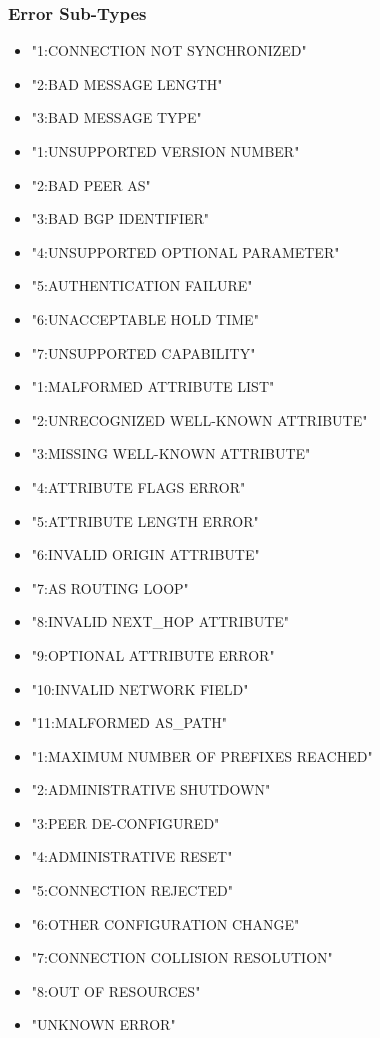\documentclass{article}
\begin{document}
\subsubsection{Error Sub-Types}
\begin{itemize}
\item{"1:CONNECTION NOT SYNCHRONIZED"}
\item{"2:BAD MESSAGE LENGTH"}
\item{"3:BAD MESSAGE TYPE"}

\item{"1:UNSUPPORTED VERSION NUMBER"}
\item{"2:BAD PEER AS"}
\item{"3:BAD BGP IDENTIFIER"}
\item{"4:UNSUPPORTED OPTIONAL PARAMETER"}
\item{"5:AUTHENTICATION FAILURE"}
\item{"6:UNACCEPTABLE HOLD TIME"}
\item{"7:UNSUPPORTED CAPABILITY"}

\item{"1:MALFORMED ATTRIBUTE LIST"}
\item{"2:UNRECOGNIZED WELL-KNOWN ATTRIBUTE"}
\item{"3:MISSING WELL-KNOWN ATTRIBUTE"}
\item{"4:ATTRIBUTE FLAGS ERROR"}
\item{"5:ATTRIBUTE LENGTH ERROR"}
\item{"6:INVALID ORIGIN ATTRIBUTE"}
\item{"7:AS ROUTING LOOP"}
\item{"8:INVALID NEXT_HOP ATTRIBUTE"}
\item{"9:OPTIONAL ATTRIBUTE ERROR"}
\item{"10:INVALID NETWORK FIELD"}
\item{"11:MALFORMED AS_PATH"}

\item{"1:MAXIMUM NUMBER OF PREFIXES REACHED"}
\item{"2:ADMINISTRATIVE SHUTDOWN"}
\item{"3:PEER DE-CONFIGURED"}
\item{"4:ADMINISTRATIVE RESET"}
\item{"5:CONNECTION REJECTED"}
\item{"6:OTHER CONFIGURATION CHANGE"}
\item{"7:CONNECTION COLLISION RESOLUTION"}
\item{"8:OUT OF RESOURCES"}

\item{"UNKNOWN ERROR"}
\end{itemize}
\end{document}
